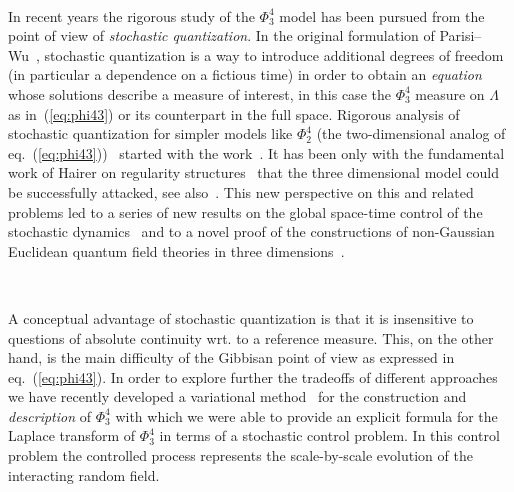 \documentclass[11pt]{article}
\newcommand{\tmtextit}[1]{{\itshape{#1}}}
\begin{document}
\

In recent years the rigorous study of the $\Phi^4_3$ model has been pursued
from the point of view of \tmtextit{stochastic quantization}. In the original
formulation of Parisi--Wu~{\cite{parisi_perturbation_1981}}, stochastic
quantization is a way to introduce additional degrees of freedom (in
particular a dependence on a fictious time) in order to obtain an
\tmtextit{equation} whose solutions describe a measure of interest, in this
case the $\Phi^4_3$ measure on $\Lambda$ as in~(\ref{eq:phi43}) or its
counterpart in the full space. Rigorous analysis of stochastic quantization
for simpler models like $\Phi^4_2$ (the two-dimensional analog of
eq.~(\ref{eq:phi43})) \ started with the
work~{\cite{jona_lasinio_stochastic_1985}}. It has been only with the
fundamental work of Hairer on regularity
structures~{\cite{hairer_theory_2014}} that the three dimensional model could
be successfully attacked, see
also~{\cite{catellier_paracontrolled_2013,kupiainen_renormalization_2016}}.
This new perspective on this and related problems led to a series of new
results on the global space-time control of the stochastic
dynamics~{\cite{MWcomedown,gubinelli_global_2019,albeverio_invariant_2017,moinat_space_time_2018}}
and to a novel proof of the constructions of non-Gaussian Euclidean quantum
field theories in three dimensions~{\cite{gubinelli_pde_2018}}.

\

A conceptual advantage of stochastic quantization is that it is insensitive
to questions of absolute continuity wrt. to a reference measure. This, on the
other hand, is the main difficulty of the Gibbisan point of view as expressed
in eq.~(\ref{eq:phi43}). In order to explore further the tradeoffs of
different approaches we have recently developed a variational
method~{\cite{barashkov_gubinelli_variational}} for the construction and
\tmtextit{description} of $\Phi^4_3$ with which we were able to provide an
explicit formula for the Laplace transform of $\Phi^4_3$ in terms of a
stochastic control problem. In this control problem the controlled process
represents the scale-by-scale evolution of the interacting random field.

\
\end{document}
